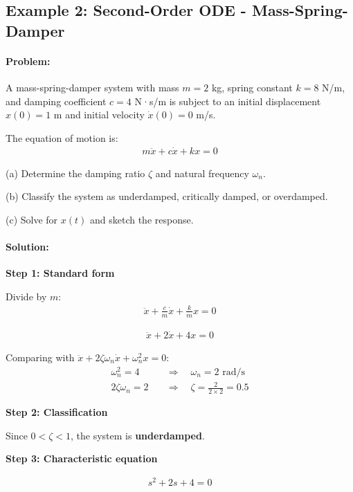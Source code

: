 \documentclass[11pt,a4paper]{article}
\begin{document}
\subsection{Example 2: Second-Order ODE - Mass-Spring-Damper}

\paragraph{Problem:} A mass-spring-damper system with mass $m = 2$ kg, spring constant $k = 8$ N/m, and damping coefficient $c = 4$ N·s/m is subject to an initial displacement $x(0) = 1$ m and initial velocity $\dot{x}(0) = 0$ m/s.

The equation of motion is:
\begin{align}
  m\ddot{x} + c\dot{x} + kx = 0
\end{align}

(a) Determine the damping ratio $\zeta$ and natural frequency $\omega_n$.

(b) Classify the system as underdamped, critically damped, or overdamped.

(c) Solve for $x(t)$ and sketch the response.

\paragraph{Solution:}

\textbf{Step 1: Standard form}

Divide by $m$:
\begin{align}
  \ddot{x} + \frac{c}{m}\dot{x} + \frac{k}{m}x = 0
\end{align}

\begin{align}
  \ddot{x} + 2\dot{x} + 4x = 0
\end{align}

Comparing with $\ddot{x} + 2\zeta\omega_n\dot{x} + \omega_n^2 x = 0$:
\begin{align}
  \omega_n^2 = 4 \quad &\Rightarrow \quad \omega_n = 2 \text{ rad/s} \\
  2\zeta\omega_n = 2 \quad &\Rightarrow \quad \zeta = \frac{2}{2 \times 2} = 0.5
\end{align}

\textbf{Step 2: Classification}

Since $0 < \zeta < 1$, the system is \textbf{underdamped}.

\textbf{Step 3: Characteristic equation}

\begin{align}
  s^2 + 2s + 4 = 0
\end{align}
\end{document}
